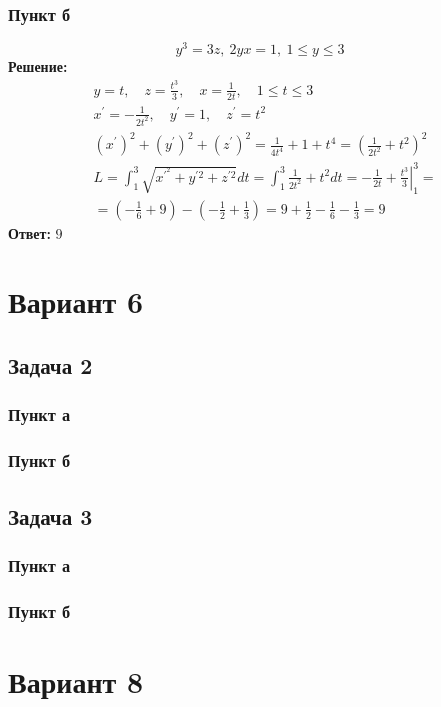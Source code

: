 \subsubsection*{Пункт б}
$$y^3 = 3z, ~ 2yx = 1, ~ 1 \leq y \leq 3$$
\textbf{Решение:} \\
$$
\begin{aligned}
& y=t, \quad z=\frac{t^3}{3}, \quad x=\frac{1}{2 t}, \quad 1 \leq t \leq 3 \\
& x^{\prime}=-\frac{1}{2 t^2}, \quad y^{\prime}=1, \quad z^{\prime}=t^2 \\
& \left(x^{\prime}\right)^2+\left(y^{\prime}\right)^2+\left(z^{\prime}\right)^2=\frac{1}{4 t^4}+1+t^4=\left(\frac{1}{2 t^2}+t^2\right)^2 \\
& L=\int_1^3 \sqrt{x^{\prime^2}+y^{\prime 2}+z^{\prime 2}} d t=\int_1^3 \frac{1}{2 t^2}+t^2 d t=-\frac{1}{2 t}+\left.\frac{t^3}{3}\right|_1 ^3= \\
& =\left(-\frac{1}{6}+9\right)-\left(-\frac{1}{2}+\frac{1}{3}\right)=9+\frac{1}{2}-\frac{1}{6}-\frac{1}{3}=9 \qquad 
\end{aligned}
$$
\textbf{Ответ:} $9$ \newpage
\section*{Вариант 6}
\subsection*{Задача 2}
\subsubsection*{Пункт а}
\subsubsection*{Пункт б}

\newpage
\subsection*{Задача 3}
\subsubsection*{Пункт а}
\subsubsection*{Пункт б}

\newpage
\section*{Вариант 8}
